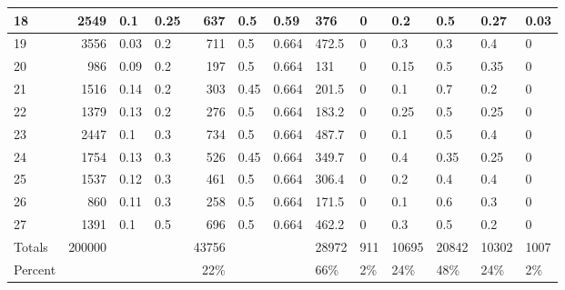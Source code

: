 \documentclass[12pt]{article}
\begin{document}
\begin{table}[H]
\begin{tabular}{ | l | r | l | l | r | l | l | l | l |l | l | l | l | }
18&2549&0.1&0.25&637&0.5&0.59&376&0&0.2&0.5&0.27&0.03 \\ \hline
19&3556&0.03&0.2&711&0.5&0.664&472.5&0&0.3&0.3&0.4&0 \\ \hline
20&986&0.09&0.2&197&0.5&0.664&131&0&0.15&0.5&0.35&0 \\ \hline
21&1516&0.14&0.2&303&0.45&0.664&201.5&0&0.1&0.7&0.2&0 \\ \hline
22&1379&0.13&0.2&276&0.5&0.664&183.2&0&0.25&0.5&0.25&0 \\ \hline
23&2447&0.1&0.3&734&0.5&0.664&487.7&0&0.1&0.5&0.4&0 \\ \hline
24&1754&0.13&0.3&526&0.45&0.664&349.7&0&0.4&0.35&0.25&0 \\ \hline
25&1537&0.12&0.3&461&0.5&0.664&306.4&0&0.2&0.4&0.4&0 \\ \hline
26&860&0.11&0.3&258&0.5&0.664&171.5&0&0.1&0.6&0.3&0 \\ \hline
27&1391&0.1&0.5&696&0.5&0.664&462.2&0&0.3&0.5&0.2&0 \\ \hline
Totals&200000&&&43756&&&28972&911&10695&20842&10302&1007 \\ \hline
Percent&&&&22\%&&&66\%&2\%&24\%&48\%&24\%&2\% \\ \hline
\end{tabular}
\end{table}
\end{document}
